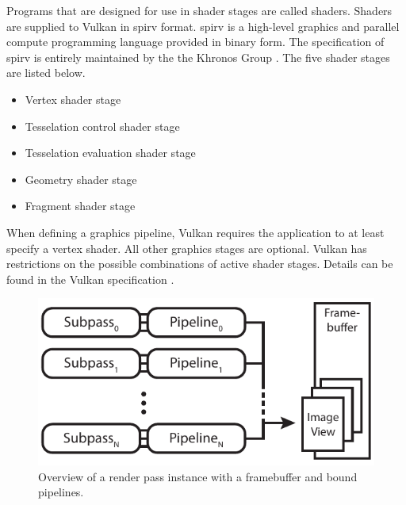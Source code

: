     Programs that are designed for use in shader stages are called shaders. Shaders are supplied to Vulkan in \gls{spirv} format. \gls{spirv} is a high-level graphics and parallel compute programming language provided in binary form. The specification of \gls{spirv} is entirely maintained by the the Khronos Group \cite{spirvspecprov}. The five shader stages are listed below.

    \begin{itemize}
      \item Vertex shader stage
      \item Tesselation control shader stage
      \item Tesselation evaluation shader stage
      \item Geometry shader stage
      \item Fragment shader stage
    \end{itemize}

    When defining a graphics pipeline, Vulkan requires the \gls{application} to at least specify a vertex shader. All other graphics stages are optional. Vulkan has restrictions on the possible combinations of active shader stages. Details can be found in the Vulkan specification \cite{vkspec}.



    \begin{figure}
      \centering
      \includegraphics[width=\textwidth]{Main/Images/RenderPassInstanceSample}
      \caption{Overview of a render pass instance with a framebuffer and bound pipelines.}
      \label{fig:RenderPassInstanceSample}
    \end{figure}


